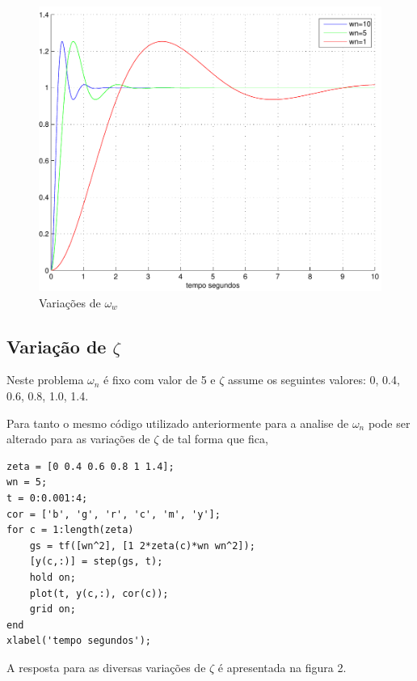 \documentclass[paper=a4, fontsize=11pt]{article}
\begin{document}
\begin{figure}
    \begin{center}
    \includegraphics[scale=.5]{q1ia.pdf}
    \caption{Variações de $\omega_w$}
    \end{center}
\end{figure}

\subsection{Variação de $\zeta$}

Neste problema $\omega_n$ é fixo com valor de 5 e $\zeta$ assume os seguintes
valores: 0, 0.4, 0.6, 0.8, 1.0, 1.4.

Para tanto o mesmo código utilizado anteriormente para a analise de $\omega_n$
pode ser alterado para as variações de $\zeta$ de tal forma que fica,

\begin{lstlisting}
zeta = [0 0.4 0.6 0.8 1 1.4];
wn = 5;
t = 0:0.001:4;
cor = ['b', 'g', 'r', 'c', 'm', 'y'];
for c = 1:length(zeta)
    gs = tf([wn^2], [1 2*zeta(c)*wn wn^2]);
    [y(c,:)] = step(gs, t);
    hold on;
    plot(t, y(c,:), cor(c));
    grid on;
end
xlabel('tempo segundos');
\end{lstlisting}

A resposta para as diversas variações de $\zeta$ é apresentada na figura 2.
\end{document}
